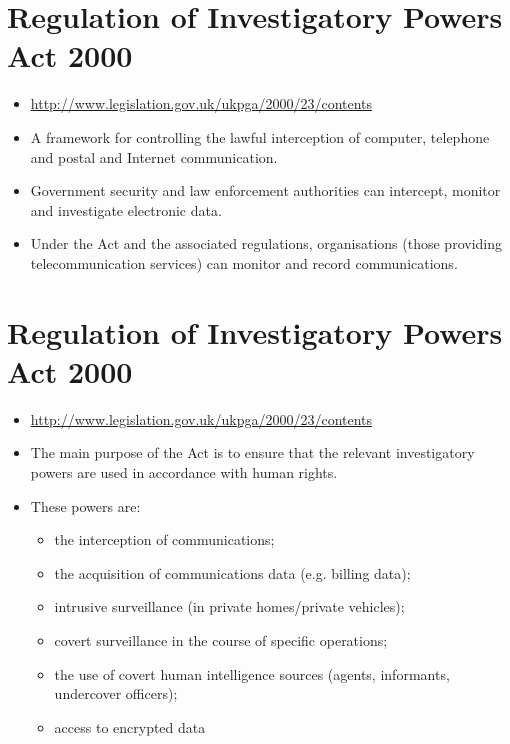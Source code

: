 \documentclass{article}
\begin{document}
\section{Regulation of Investigatory Powers Act 2000}
\begin{itemize}
\item \url{http://www.legislation.gov.uk/ukpga/2000/23/contents}
\item A framework for controlling the lawful interception of computer, telephone and postal and Internet communication.
\item Government security and law enforcement authorities can intercept, monitor and investigate electronic data.
\item Under the Act and the associated regulations, organisations (those providing telecommunication services) can monitor and record communications.
\end{itemize}



\section{Regulation of Investigatory Powers Act 2000}
\begin{itemize}
\item \url{http://www.legislation.gov.uk/ukpga/2000/23/contents}
\item The main purpose of the Act is to ensure that the relevant investigatory powers are used in accordance with human rights. 
\item These powers are:
\begin{itemize}
\item the interception of communications;
\item the acquisition of communications data (e.g. billing data);
\item intrusive surveillance (in private homes/private vehicles);
\item covert surveillance in the course of specific operations;
\item the use of covert human intelligence sources (agents, informants, undercover officers);
\item access to encrypted data
\end{itemize}
\end{itemize}
\end{document}
